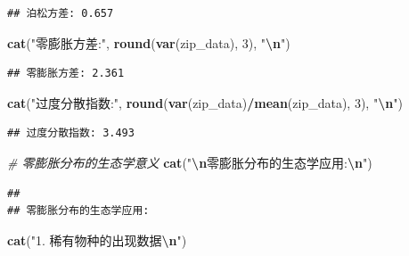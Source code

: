 \documentclass[
]{book}
\newenvironment{Shaded}{\begin{snugshade}}{\end{snugshade}}
\newcommand{\CommentTok}[1]{\textcolor[rgb]{0.56,0.35,0.01}{\textit{#1}}}
\newcommand{\DecValTok}[1]{\textcolor[rgb]{0.00,0.00,0.81}{#1}}
\newcommand{\FunctionTok}[1]{\textcolor[rgb]{0.13,0.29,0.53}{\textbf{#1}}}
\newcommand{\NormalTok}[1]{#1}
\newcommand{\SpecialCharTok}[1]{\textcolor[rgb]{0.81,0.36,0.00}{\textbf{#1}}}
\newcommand{\StringTok}[1]{\textcolor[rgb]{0.31,0.60,0.02}{#1}}
\begin{document}
\begin{verbatim}
## 泊松方差: 0.657
\end{verbatim}

\begin{Shaded}
\begin{Highlighting}[]
\FunctionTok{cat}\NormalTok{(}\StringTok{"零膨胀方差:"}\NormalTok{, }\FunctionTok{round}\NormalTok{(}\FunctionTok{var}\NormalTok{(zip\_data), }\DecValTok{3}\NormalTok{), }\StringTok{"}\SpecialCharTok{\textbackslash{}n}\StringTok{"}\NormalTok{)}
\end{Highlighting}
\end{Shaded}

\begin{verbatim}
## 零膨胀方差: 2.361
\end{verbatim}

\begin{Shaded}
\begin{Highlighting}[]
\FunctionTok{cat}\NormalTok{(}\StringTok{"过度分散指数:"}\NormalTok{, }\FunctionTok{round}\NormalTok{(}\FunctionTok{var}\NormalTok{(zip\_data)}\SpecialCharTok{/}\FunctionTok{mean}\NormalTok{(zip\_data), }\DecValTok{3}\NormalTok{), }\StringTok{"}\SpecialCharTok{\textbackslash{}n}\StringTok{"}\NormalTok{)}
\end{Highlighting}
\end{Shaded}

\begin{verbatim}
## 过度分散指数: 3.493
\end{verbatim}

\begin{Shaded}
\begin{Highlighting}[]
\CommentTok{\# 零膨胀分布的生态学意义}
\FunctionTok{cat}\NormalTok{(}\StringTok{"}\SpecialCharTok{\textbackslash{}n}\StringTok{零膨胀分布的生态学应用:}\SpecialCharTok{\textbackslash{}n}\StringTok{"}\NormalTok{)}
\end{Highlighting}
\end{Shaded}

\begin{verbatim}
## 
## 零膨胀分布的生态学应用:
\end{verbatim}

\begin{Shaded}
\begin{Highlighting}[]
\FunctionTok{cat}\NormalTok{(}\StringTok{"1. 稀有物种的出现数据}\SpecialCharTok{\textbackslash{}n}\StringTok{"}\NormalTok{)}
\end{Highlighting}
\end{Shaded}
\end{document}
